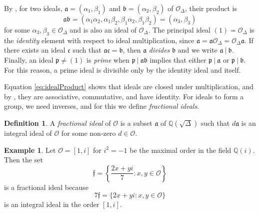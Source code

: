 \documentclass{ucalgthes1}
\theoremstyle{definition}
\newtheorem{defn}[thm]{Definition}
\newtheorem{example}[thm]{Example}
\newcommand{\QQ}{\mathbb{Q}}
\newcommand{\OO}{\mathcal{O}}
\newcommand{\ideal}{\mathfrak}
\begin{document}
By \cite[p.16]{Ramachandran2006}, for two ideals, $\ideal a = (\alpha_1, \beta_1)$ and $\ideal b = (\alpha_2, \beta_2)$ of $\OO_\Delta$, their product is
\begin{equation}
	\ideal a \ideal b = (\alpha_1 \alpha_2, \alpha_1 \beta_2, \beta_1 \alpha_2, \beta_1 \beta_2) = (\alpha_3, \beta_3) \label{eq:idealProduct}
\end{equation}
for some $\alpha_3, \beta_3 \in \OO_\Delta$ and is also an ideal of $\OO_\Delta$. The principal ideal $(1) = \OO_\Delta$ is the \emph{identity} element with respect to ideal multiplication, since $\ideal a = \ideal a \OO_\Delta = \OO_\Delta \ideal a$.  If there exists an ideal $\ideal c$ such that $\ideal a \ideal c = \ideal b$, then $\ideal a$ \emph{divides} $\ideal b$ and we write $\ideal a ~|~ \ideal b$.  Finally, an ideal $\ideal p \neq (1)$ is \emph{prime} when $\ideal p ~|~ \ideal a \ideal b$ implies that either $\ideal p ~|~ \ideal a$ or $\ideal p ~|~ \ideal b$.  For this reason, a prime ideal is divisible only by the identity ideal and itself.

Equation \ref{eq:idealProduct} shows that ideals are closed under multiplication, and by \cite[p.117]{Cohn1980}, they are associative, commutative, and have identity.  For ideals to form a group, we need inverses, and for this we define \emph{fractional ideals}.

\begin{defn} \cite[Definition 2.23]{Sawilla2004}
A \emph{fractional ideal} of $\OO$ is a subset $\ideal a$ of $\QQ(\sqrt \Delta)$ such that $d \ideal a$ is an integral ideal of $\OO$ for some non-zero $d \in \OO$.
\end{defn}

\begin{example}
Let $\OO = [1, i]$ for $i^2 = -1$ be the maximal order in the field $\QQ(i)$.  Then the set
\[
\ideal f = \left \{ \frac{2 x + y i}{7} : x,y \in \OO \right \}
\]
is a fractional ideal because
\[
	7 \ideal f = \{2x + y i : x, y \in \OO\}
\]
is an integral ideal in the order $[1, i]$.
\end{example}
\end{document}
